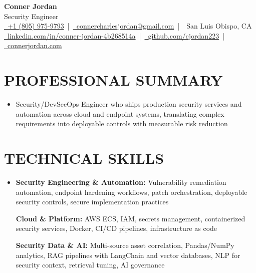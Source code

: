 \documentclass[letterpaper,10pt]{article}
\newcommand{\resumeSubHeadingListStart}{\begin{itemize}[leftmargin=0in,label={}]}
\newcommand{\resumeSubHeadingListEnd}{\end{itemize}}
\begin{document}
\begin{center}
  {\Huge \textbf{Conner Jordan}}\\[0pt]
  {\Large Security Engineer}\\[0pt]
  \href{tel:+18059759793}{\faPhone\ +1 (805) 975-9793} \,|\, 
  \href{mailto:connercharlesjordan@gmail.com}{\faEnvelope\ connercharlesjordan@gmail.com} \,|\, 
  \faMapMarker\ San Luis Obispo, CA \\[-2pt]
  \href{https://www.linkedin.com/in/conner-jordan-4b268514a/}{\faLinkedin\ linkedin.com/in/conner-jordan-4b268514a}
  \,|\, \href{https://github.com/cjordan223}{\faGithub\ github.com/cjordan223}
  \,|\, \href{https://connerjordan.com/}{\faGlobe\ connerjordan.com}
\end{center}

\vspace{4pt}

\section{PROFESSIONAL SUMMARY}
\vspace{8pt}
\resumeSubHeadingListStart
\item {\small
Security/DevSecOps Engineer who ships production security services and automation across cloud and endpoint systems, translating complex requirements into deployable controls with measurable risk reduction}
\resumeSubHeadingListEnd
\vspace{6pt}

\section{TECHNICAL SKILLS}
\vspace{6pt}
\resumeSubHeadingListStart
\item {\small
\textbf{Security Engineering \& Automation:} Vulnerability remediation automation, endpoint hardening workflows, patch orchestration, deployable security controls, secure implementation practices

\vspace{3pt}
\textbf{Cloud \& Platform:} AWS ECS, IAM, secrets management, containerized security services, Docker, CI/CD pipelines, infrastructure as code

\vspace{3pt}
\textbf{Security Data \& AI:} Multi-source asset correlation, Pandas/NumPy analytics, RAG pipelines with LangChain and vector databases, NLP for security context, retrieval tuning, AI governance
}
\resumeSubHeadingListEnd
\vspace{6pt}
\end{document}
